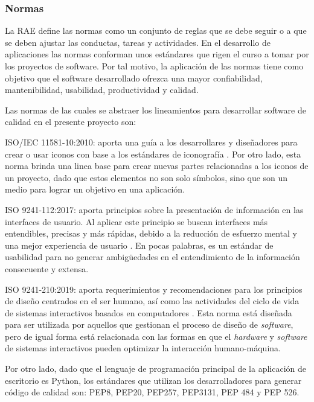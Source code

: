 \subsubsection{Normas}
La RAE \parencite{RAEDefNorma} define las normas como un conjunto de reglas que se debe seguir o a que se deben ajustar las conductas, tareas y actividades. En el desarrollo de aplicaciones las normas conforman unos estándares que rigen el curso a tomar por los proyectos de software. Por tal motivo, la aplicación de las normas tiene como objetivo que el software desarrollado ofrezca una mayor confiabilidad, mantenibilidad, usabilidad, productividad y calidad. 

Las normas de las cuales se abstraer los lineamientos para desarrollar software de calidad en el presente proyecto son:

\begin{APAitemize}
    \item ISO/IEC 11581-10:2010: aporta una guía a los desarrollares y diseñadores para crear o usar iconos con base a los estándares de iconografía \parencite{Iso11581}. Por otro lado, esta norma brinda una linea base para crear nuevas partes relacionadas a los iconos de un proyecto, dado que estos elementos no son solo símbolos, sino que son un medio para lograr un objetivo en una aplicación.
    \item ISO 9241-112:2017: aporta principios sobre la presentación de información en las interfaces de usuario. Al aplicar este principio se buscan interfaces más entendibles, precisas y  más rápidas, debido a la reducción de esfuerzo mental y una mejor experiencia de usuario \parencite{Iso9241-112}. En pocas palabras, es un estándar de usabilidad para no generar ambigüedades en el entendimiento de la información consecuente y extensa.
    \item ISO 9241-210:2019: aporta requerimientos y recomendaciones para los principios de diseño centrados en el ser humano, así como las actividades del ciclo de vida de sistemas interactivos basados en computadores \parencite{Iso9241-210}. Esta norma está diseñada para ser utilizada por aquellos que gestionan el proceso de diseño de \textit{software}, pero de igual forma está relacionada con las formas en que el \textit{hardware} y \textit{software} de sistemas interactivos pueden optimizar la interacción humano-máquina.
\end{APAitemize}

Por otro lado, dado que el lenguaje de programación principal de la aplicación de escritorio es Python, los estándares que utilizan los desarrolladores para generar código de calidad son: PEP8, PEP20, PEP257, PEP3131, PEP 484 y PEP 526.


